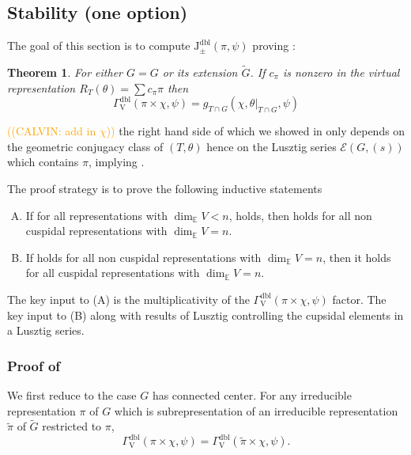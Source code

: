 \documentclass[12pt, reqno]{amsart}
\newtheorem{theorem}{Theorem}[section]
\theoremstyle{definition}
\theoremstyle{definition}
\theoremstyle{definition}
\newcommand{\hermitianSpace}{\mathrm{V}}
\newcommand{\fieldCharacter}{\psi}
\newcommand{\GroupExtension}[1]{\widetilde{#1}}
\newcommand{\dblJacobiSumScalar}[2]{\mathrm{J}_{\pm}^{\mathrm{dbl}}\left(#1, #2\right)}
\newcommand{\dblGammaFactorSpace}[4]{\Gamma^{\mathrm{dbl}}_{#1}\left(#2 \times #3, #4\right)}
\newcommand{\LusztigSeries}[2]{\mathcal{E}\left(#1, (#2)\right)}
\newcommand{\calvin}[1]{\textcolor{orange}{\sffamily ((CALVIN: #1))}}
\begin{document}
\subsection{Stability (one option)}\label{subsec:stability}
The goal of this section is to compute $\dblJacobiSumScalar{\pi}{\fieldCharacter}$ proving :
\begin{theorem}
\label{thm:doubling-method-gamma-factor-for-deligne-lusztig} For either $G=G$ or its extension $\GroupExtension{G}$. If $c_{\pi}$ is nonzero in the virtual representation $R_T(\theta) = \sum c_{\pi} \pi$ then
$$\dblGammaFactorSpace{\hermitianSpace}{\pi}{\chi}{\fieldCharacter} = g_{T \cap G}\left(\chi,\theta|_{T \cap G}, \fieldCharacter\right)$$
\end{theorem}
\calvin{add in $\chi$} the right hand side of which we showed in  only depends on the geometric conjugacy class of $(T,\theta)$ hence on the Lusztig series $\LusztigSeries{G}{s}$ which contains $\pi$, implying .

The proof strategy is to prove the following inductive statements
\begin{enumerate}[(A)]
	\item If for all representations with $\dim_{\mathbb{E}} V < n$,  holds, then  holds for all non cuspidal representations with $\dim_{\mathbb{E}} V = n$.
	\item If  holds for all non cuspidal representations with $\dim_{\mathbb{E}} V = n$, then it holds for all cuspidal representations with $\dim_{\mathbb{E}} V = n$.
\end{enumerate}
The key input to (A) is the multiplicativity of the $\dblGammaFactorSpace{\hermitianSpace}{\pi}{\chi}{\fieldCharacter}$ factor. The key input to (B)  along with results of Lusztig controlling the cupsidal elements in a Lusztig series.

\subsubsection{Proof of }
We first reduce  to the case $G$ has connected center. For any irreducible representation $\pi$ of $G$ which is subrepresentation of an irreducible representation $\tilde{\pi}$ of $\GroupExtension{G}$ restricted to $\pi$,
\[
    \dblGammaFactorSpace{\hermitianSpace}{\pi}{\chi}{\fieldCharacter} = \dblGammaFactorSpace{\hermitianSpace}{\tilde{\pi}}{\chi}{\fieldCharacter}.
\]
\end{document}
